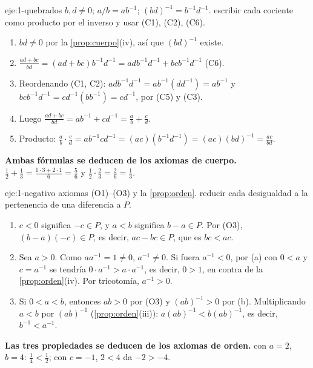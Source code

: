 \begin{solucion}{eje:1-quebrados}
\datos $b,d\neq0$; $a/b=ab^{-1}$; $(bd)^{-1}=b^{-1}d^{-1}$.
\planteamiento escribir cada cociente como producto por el inverso y usar (C1), (C2), (C6).
\pasos
\begin{enumerate}[label=\arabic*.]
  \item $bd\neq0$ por la \cref{prop:cuerpo}(iv), así que $(bd)^{-1}$ existe.
  \item $\frac{ad+bc}{bd}=(ad+bc)b^{-1}d^{-1}=adb^{-1}d^{-1}+bcb^{-1}d^{-1}$ (C6).
  \item Reordenando (C1, C2): $adb^{-1}d^{-1}=ab^{-1}(dd^{-1})=ab^{-1}$ y $bcb^{-1}d^{-1}=cd^{-1}(bb^{-1})=cd^{-1}$, por (C5) y (C3).
  \item Luego $\frac{ad+bc}{bd}=ab^{-1}+cd^{-1}=\frac ab+\frac cd$.
  \item Producto: $\frac ab\cdot\frac cd=ab^{-1}cd^{-1}=(ac)(b^{-1}d^{-1})=(ac)(bd)^{-1}=\frac{ac}{bd}$.
\end{enumerate}
\resultado \textbf{Ambas fórmulas se deducen de los axiomas de cuerpo.}
\comprobacion $\frac12+\frac13=\frac{1\cdot3+2\cdot1}{6}=\frac56$ y $\frac12\cdot\frac23=\frac26=\frac13$.
\end{solucion}

\begin{solucion}{eje:1-negativo}
\datos axiomas (O1)--(O3) y la \cref{prop:orden}.
\planteamiento reducir cada desigualdad a la pertenencia de una diferencia a $P$.
\pasos
\begin{enumerate}[label=(\alph*)]
  \item $c<0$ significa $-c\in P$, y $a<b$ significa $b-a\in P$. Por (O3), $(b-a)(-c)\in P$, es decir, $ac-bc\in P$, que es $bc<ac$.
  \item Sea $a>0$. Como $aa^{-1}=1\neq 0$, $a^{-1}\neq0$. Si fuera $a^{-1}<0$, por (a) con $0<a$ y $c=a^{-1}$ se tendría $0\cdot a^{-1}>a\cdot a^{-1}$, es decir, $0>1$, en contra de la \cref{prop:orden}(iv). Por tricotomía, $a^{-1}>0$.
  \item Si $0<a<b$, entonces $ab>0$ por (O3) y $(ab)^{-1}>0$ por (b). Multiplicando $a<b$ por $(ab)^{-1}$ (\cref{prop:orden}(iii)): $a(ab)^{-1}<b(ab)^{-1}$, es decir, $b^{-1}<a^{-1}$.
\end{enumerate}
\resultado \textbf{Las tres propiedades se deducen de los axiomas de orden.}
\comprobacion con $a=2$, $b=4$: $\frac14<\frac12$; con $c=-1$, $2<4$ da $-2>-4$.
\end{solucion}

